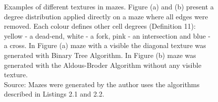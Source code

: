 \begin{figure}[!h]
\begin{subfigure}{0.4\textwidth}
    \caption{}
    \end{subfigure}
    \caption{Examples of different textures in mazes. Figure (a) and (b) present a degree distribution applied directly on a maze where all edges were removed.
    Each colour defines other cell degrees (Definition 11): yellow - a dead-end, white - a fork, pink - an intersection and blue - a cross. In Figure (a) maze with a visible
    the diagonal texture was generated with Binary Tree Algorithm. In Figure (b) maze was generated with the Aldous-Broder Algorithm without any visible texture.\\Source: Mazes were generated by
    the author uses the algorithms described in Listings 2.1 and 2.2.}
    \end{figure}
